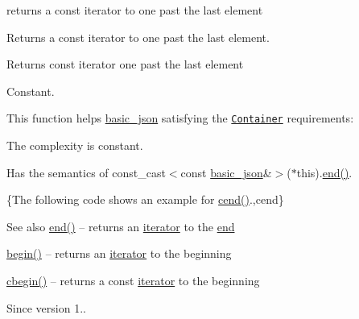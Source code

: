 returns a const iterator to one past the last element 

Returns a const iterator to one past the last element.

 \begin{DoxyReturn}{Returns}
const iterator one past the last element
\end{DoxyReturn}
Constant.

This function helps {\ttfamily \hyperlink{classnlohmann_1_1basic__json}{basic\+\_\+json}} satisfying the \href{https://en.cppreference.com/w/cpp/named_req/Container}{\tt Container} requirements\+:
\begin{DoxyItemize}
\item The complexity is constant.
\item Has the semantics of {\ttfamily const\+\_\+cast$<$const \hyperlink{classnlohmann_1_1basic__json}{basic\+\_\+json}\&$>$($\ast$this).\hyperlink{classnlohmann_1_1basic__json_a13e032a02a7fd8a93fdddc2fcbc4763c}{end()}}.
\end{DoxyItemize}

\{The following code shows an example for {\ttfamily \hyperlink{classnlohmann_1_1basic__json_a8dba7b7d2f38e6b0c614030aa43983f6}{cend()}}.,cend\}

\begin{DoxySeeAlso}{See also}
\hyperlink{classnlohmann_1_1basic__json_a13e032a02a7fd8a93fdddc2fcbc4763c}{end()} -- returns an \hyperlink{classnlohmann_1_1basic__json_a099316232c76c034030a38faa6e34dca}{iterator} to the \hyperlink{classnlohmann_1_1basic__json_a13e032a02a7fd8a93fdddc2fcbc4763c}{end} 

\hyperlink{classnlohmann_1_1basic__json_a0ff28dac23f2bdecee9564d07f51dcdc}{begin()} -- returns an \hyperlink{classnlohmann_1_1basic__json_a099316232c76c034030a38faa6e34dca}{iterator} to the beginning 

\hyperlink{classnlohmann_1_1basic__json_ad865d6c291b237ae508d5cb2146b5877}{cbegin()} -- returns a const \hyperlink{classnlohmann_1_1basic__json_a099316232c76c034030a38faa6e34dca}{iterator} to the beginning
\end{DoxySeeAlso}
\begin{DoxySince}{Since}
version 1.. 
\end{DoxySince}
